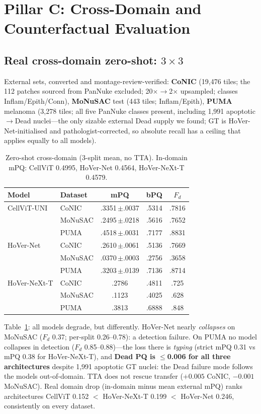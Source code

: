 \documentclass[11pt]{article}
\begin{document}
\section{Pillar C: Cross-Domain and Counterfactual Evaluation}
\label{sec:pillarC}

\subsection{Real cross-domain zero-shot: $3{\times}3$}
\label{sec:external}

External sets, converted and montage-review-verified: \textbf{CoNIC} (19,476 tiles; the 112
patches sourced from PanNuke excluded; 20$\times\rightarrow$2$\times$ upsampled; classes
Inflam/Epith/Conn), \textbf{MoNuSAC} test (443 tiles; Inflam/Epith), \textbf{PUMA} melanoma
(3,278 tiles; all five PanNuke classes present, including 1,991 apoptotic$\rightarrow$Dead
nuclei---the only sizable external Dead supply we found; GT is HoVer-Net-initialised and
pathologist-corrected, so absolute recall has a ceiling that applies equally to all models).

\begin{table}[t]
\centering\small
\caption{Zero-shot cross-domain (3-split mean, no TTA). In-domain mPQ: CellViT 0.4995,
HoVer-Net 0.4564, HoVer-NeXt-T 0.4579.}
\label{tab:external}
\begin{tabular}{llccc}
\toprule
Model & Dataset & mPQ & bPQ & $F_d$ \\
\midrule
CellViT-UNI  & CoNIC   & .3351\,$\pm$.0037 & .5314 & .7816 \\
             & MoNuSAC & .2495\,$\pm$.0218 & .5616 & .7652 \\
             & PUMA    & .4518\,$\pm$.0031 & .7177 & .8831 \\
\midrule
HoVer-Net    & CoNIC   & .2610\,$\pm$.0061 & .5136 & .7669 \\
             & MoNuSAC & .0370\,$\pm$.0003 & .2756 & .3658 \\
             & PUMA    & .3203\,$\pm$.0139 & .7136 & .8714 \\
\midrule
HoVer-NeXt-T & CoNIC   & .2786 & .4811 & .725 \\
             & MoNuSAC & .1123 & .4025 & .628 \\
             & PUMA    & .3813 & .6888 & .848 \\
\bottomrule
\end{tabular}
\end{table}

Table~\ref{tab:external}: all models degrade, but differently. HoVer-Net nearly
\emph{collapses} on MoNuSAC ($F_d$ 0.37; per-split 0.26--0.78): a detection failure.
On PUMA no model collapses in detection ($F_d$ 0.85--0.88)---the loss there is \emph{typing}
(strict mPQ 0.31 vs mPQ 0.38 for HoVer-NeXt-T), and \textbf{Dead PQ is $\le$0.006 for all three
architectures} despite 1,991 apoptotic GT nuclei: the Dead failure mode follows the models
out-of-domain. TTA does not rescue transfer ($+0.005$ CoNIC, $-0.001$ MoNuSAC). Real domain
drop (in-domain minus mean external mPQ) ranks architectures CellViT 0.152 $<$ HoVer-NeXt-T
0.199 $<$ HoVer-Net 0.246, consistently on every dataset.
\end{document}
